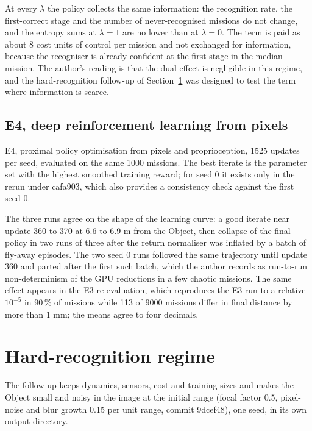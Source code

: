 \documentclass[11pt,a4paper]{article}
\newcommand{\tabfit}[1]{\begin{adjustbox}{max width=\textwidth}\small #1\end{adjustbox}}
\begin{document}
At every $\lambda$ the policy collects the same information: the recognition rate, the first-correct stage and the number of never-recognised missions do not change, and the entropy sums at $\lambda = 1$ are no lower than at $\lambda = 0$. The term is paid as about 8 cost units of control per mission and not exchanged for information, because the recogniser is already confident at the first stage in the median mission. The author's reading is that the dual effect is negligible in this regime, and the hard-recognition follow-up of Section~\ref{sec:hard} was designed to test the term where information is scarce.

\subsection{E4, deep reinforcement learning from pixels}

\begin{table}[H]\caption{E4, proximal policy optimisation from pixels and proprioception, 1525 updates per seed, evaluated on the same 1000 missions. The best iterate is the parameter set with the highest smoothed training reward; for seed 0 it exists only in the rerun under cafa903, which also provides a consistency check against the first seed 0.}
\tabfit{}\end{table}

The three runs agree on the shape of the learning curve: a good iterate near update 360 to 370 at 6.6 to 6.9 m from the Object, then collapse of the final policy in two runs of three after the return normaliser was inflated by a batch of fly-away episodes. The two seed 0 runs followed the same trajectory until update 360 and parted after the first such batch, which the author records as run-to-run non-determinism of the GPU reductions in a few chaotic missions. The same effect appears in the E3 re-evaluation, which reproduces the E3 run to a relative $10^{-5}$ in 90\,\% of missions while 113 of 9000 missions differ in final distance by more than 1 mm; the means agree to four decimals.

\section{Hard-recognition regime}\label{sec:hard}

\ifnum{}
The follow-up keeps dynamics, sensors, cost and training sizes and makes the Object small and noisy in the image at the initial range (focal factor 0.5, pixel-noise and blur growth 0.15 per unit range, commit 9dcef48), one seed, in its own output directory.
\end{document}
